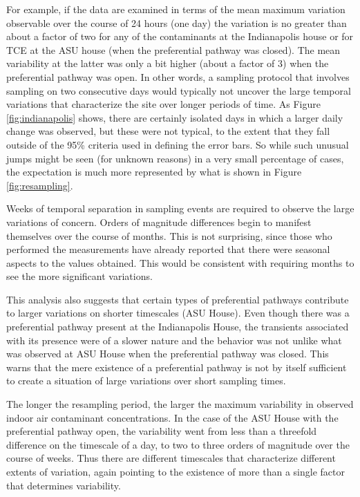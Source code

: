 For example, if the data are examined in terms of the mean maximum variation observable over the course of 24 hours (one day) the variation is no greater than about a factor of two for any of the contaminants at the Indianapolis house or for TCE at the ASU house (when the preferential pathway was closed).
The mean variability at the latter was only a bit higher (about a factor of 3) when the preferential pathway was open.
In other words, a sampling protocol that involves sampling on two consecutive days would typically not uncover the large temporal variations that characterize the site over longer periods of time.
As Figure \ref{fig:indianapolis} shows, there are certainly isolated days in which a larger daily change was observed, but these were not typical, to the extent that they fall outside of the 95\% criteria used in defining the error bars.
So while such unusual jumps might be seen (for unknown reasons) in a very small percentage of cases, the expectation is much more represented by what is shown in Figure \ref{fig:resampling}.\par

Weeks of temporal separation in sampling events are required to observe the large variations of concern.
Orders of magnitude differences begin to manifest themselves over the course of months.
This is not surprising, since those who performed the measurements have already reported that there were seasonal aspects to the values obtained.
This would be consistent with requiring months to see the more significant variations.\par

This analysis also suggests that certain types of preferential pathways contribute to larger variations on shorter timescales (ASU House).
Even though there was a preferential pathway present at the Indianapolis House, the transients associated with its presence were of a slower nature and the behavior was not unlike what was observed at ASU House when the preferential pathway was closed.
This warns that the mere existence of a preferential pathway is not by itself sufficient to create a situation of large variations over short sampling times.\par

The longer the resampling period, the larger the maximum variability in observed indoor air contaminant concentrations.
In the case of the ASU House with the preferential pathway open, the variability went from less than a threefold difference on the timescale of a day, to two to three orders of magnitude over the course of weeks.
Thus there are different timescales that characterize different extents of variation, again pointing to the existence of more than a single factor that determines variability.\par

